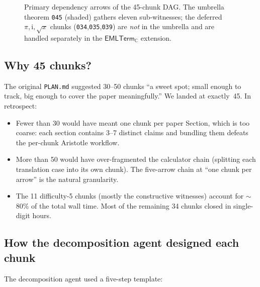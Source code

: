 \documentclass[11pt,a4paper]{article}
\theoremstyle{plain}
\theoremstyle{definition}
\newcommand{\C}{\mathbb{C}}
\newcommand{\imu}{\mathrm{i}}
\newcommand{\EMLTC}{\mathsf{EMLTerm}_\C}
\begin{document}
\begin{figure}[ht]
\caption{Primary dependency arrows of the 45-chunk DAG.  The umbrella
theorem \texttt{045} (shaded) gathers eleven sub-witnesses; the deferred
$\pi,\imu,\sqrt{x}$ chunks (\texttt{034},\texttt{035},\texttt{039}) are
\emph{not} in the umbrella and are handled separately in the
$\EMLTC$ extension.}
\label{fig:dag}
\end{figure}

\subsection{Why 45 chunks?}

The original \texttt{PLAN.md} suggested 30--50 chunks ``a sweet spot;
small enough to track, big enough to cover the paper meaningfully.''
We landed at exactly~45.  In retrospect:

\begin{itemize}[leftmargin=*,nosep]
\item Fewer than 30 would have meant one chunk per paper Section,
which is too coarse: each section contains 3--7 distinct claims and
bundling them defeats the per-chunk Aristotle workflow.
\item More than 50 would have over-fragmented the calculator chain
(splitting each translation case into its own chunk).  The
five-arrow chain at ``one chunk per arrow'' is the natural
granularity.
\item The 11 difficulty-5 chunks (mostly the constructive witnesses)
account for $\sim$80\% of the total wall time.  Most of the remaining
34 chunks closed in single-digit hours.
\end{itemize}

\subsection{How the decomposition agent designed each chunk}

The decomposition agent used a five-step template:
\end{document}
